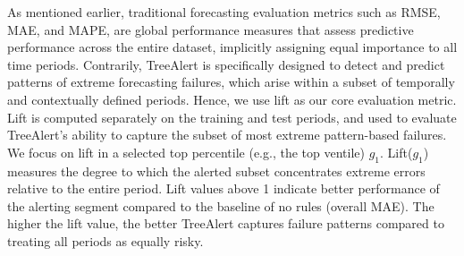 \documentclass[12pt]{article}
\begin{document}
As mentioned earlier, traditional forecasting evaluation metrics such as RMSE, MAE, and MAPE, are global performance measures that assess predictive performance across the entire dataset, implicitly assigning equal importance to all time periods. Contrarily, TreeAlert is specifically designed to detect and predict patterns of extreme forecasting failures, which  arise within a subset of temporally and contextually defined periods. Hence, we use lift as our core evaluation metric. Lift is computed separately on the training and test periods, and used to evaluate TreeAlert's ability to capture the subset of most extreme pattern-based failures. We focus on lift in a selected top percentile (e.g., the top ventile) $g_1$. Lift($g_1$) measures the degree to which the alerted subset concentrates extreme errors relative to the entire period. Lift values above 1 indicate better performance of the alerting segment compared to the baseline of no rules (overall MAE). The higher the lift value, the better TreeAlert captures failure patterns compared to treating all periods as equally risky. %


\end{document}

